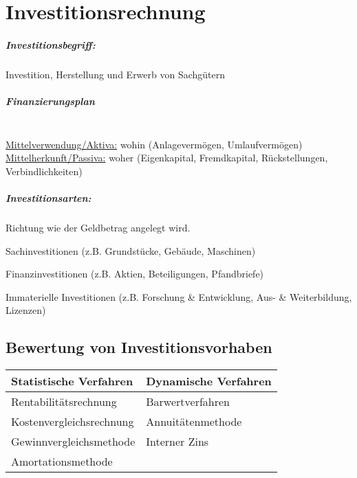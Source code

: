 
\clearpage
\chapter{Investitionsrechnung}
\paragraph{Investitionsbegriff:} Investition, Herstellung und Erwerb von Sachgütern

\paragraph{Finanzierungsplan}\quad\\
\ul{Mittelverwendung/Aktiva:} wohin (Anlagevermögen, Umlaufvermögen)
\ul{Mittelherkunft/Passiva:} woher (Eigenkapital, Fremdkapital, Rückstellungen, Verbindlichkeiten)

\paragraph{Investitionsarten:} Richtung wie der Geldbetrag angelegt wird.

\begin{compactitem}
	\item Sachinvestitionen (z.B. Grundstücke, Gebäude, Maschinen)
	\item Finanzinvestitionen (z.B. Aktien, Beteiligungen, Pfandbriefe)
	\item Immaterielle Investitionen (z.B. Forschung \& Entwicklung, Aus- \& Weiterbildung, Lizenzen)
\end{compactitem}

\clearpage
\section{Bewertung von Investitionsvorhaben}
\begin{tabular}{l|l}
	{\bf Statistische Verfahren} & {\bf Dynamische Verfahren}\\\hline
	Rentabilitätsrechnung & Barwertverfahren\\
	Kostenvergleichsrechnung & Annuitätenmethode\\
	Gewinnvergleichsmethode & Interner Zins\\
	Amortationsmethode & \\
\end{tabular}

